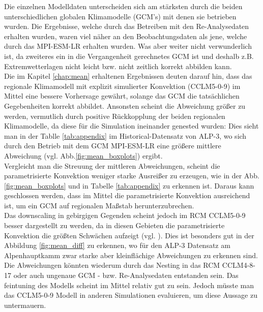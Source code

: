 Die einzelnen Modelldaten unterscheiden sich am stärksten durch die beiden unterschiedlichen globalen Klimamodelle (GCM's) mit denen sie betrieben wurden. Die Ergebnisse, welche durch das Betreiben mit den Re-Analysedaten erhalten wurden, waren viel näher an den Beobachtungsdaten als jene, welche durch das MPI-ESM-LR erhalten wurden. Was aber weiter nicht verwunderlich ist, da zweiteres ein in die Vergangenheit gerechnetes GCM ist und deshalb z.B. Extremwetterlagen nicht leicht bzw. nicht zeitlich korrekt abbilden kann.\vspace{1pt}\\

Die im Kapitel \ref{chap:mean} erhaltenen Ergebnissen deuten darauf hin, dass das regionale Klimamodell mit explizit simulierter Konvektion (CCLM5-0-9) im Mittel eine bessere Vorhersage gewährt, solange das GCM die tatsächlichen Gegebenheiten korrekt abbildet. Ansonsten scheint die Abweichung größer zu werden, vermutlich durch positive Rückkopplung der beiden regionalen Klimamodelle, da diese für die Simulation ineinander genested wurden: Dies sieht man in der Tablle \ref{tab:appendix} im Historical-Datensatz von ALP-3, wo sich durch den Betrieb mit dem GCM MPI-ESM-LR eine größere mittlere Abweichung (vgl. Abb.\ref{fig:mean_boxplots}) ergibt.\\
Vergleicht man die Streuung der mittleren Abweichungen, scheint die parametrisierte Konvektion weniger starke Ausreißer zu erzeugen, wie in der Abb.\ref{fig:mean_boxplots} und in Tabelle \ref{tab:appendix} zu erkennen ist. Daraus kann geschlossen werden, dass im Mittel die parametrisierte Konvektion ausreichend ist, um ein GCM auf regionalen Maßstab herunterzubrechen.\\
Das downscaling in gebirgigen Gegenden scheint jedoch im RCM CCLM5-0-9 besser dargestellt zu werden, da in diesen Gebieten die parametrisierte Konvektion die größten Schwächen aufzeigt (vgl. \cite{RCM}). Dies ist besonders gut in der Abbildung \ref{fig:mean_diff} zu erkennen, wo für den ALP-3 Datensatz am Alpenhauptkamm zwar starke aber kleinflächige Abweichungen zu erkennen sind. Die Abweichungen könnten wiederum durch das Nesting in das RCM CCLM4-8-17 oder auch ungenaue GCM - bzw. Re-Analysedaten entstanden sein. Das feintuning des Modells scheint im Mittel relativ gut zu sein. Jedoch müsste man das CCLM5-0-9 Modell in anderen Simulationen evaluieren, um diese Aussage zu untermauern. \vspace{1pt}\\


